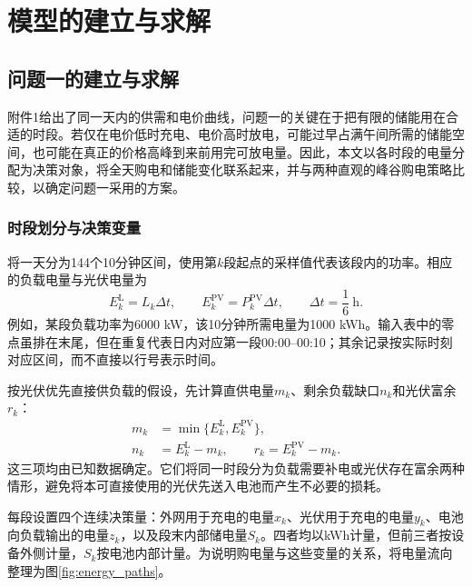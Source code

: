 \section{模型的建立与求解}
\subsection{问题一的建立与求解}

附件1给出了同一天内的供需和电价曲线，问题一的关键在于把有限的储能用在合适的时段。若仅在电价低时充电、电价高时放电，可能过早占满午间所需的储能空间，也可能在真正的价格高峰到来前用完可放电量。因此，本文以各时段的电量分配为决策对象，将全天购电和储能变化联系起来，并与两种直观的峰谷购电策略比较，以确定问题一采用的方案。

\subsubsection{时段划分与决策变量}
将一天分为144个10分钟区间，使用第$k$段起点的采样值代表该段内的功率。相应的负载电量与光伏电量为
\begin{equation}
 E^{\mathrm L}_k=L_k\Delta t,\qquad E^{\mathrm{PV}}_k=P^{\mathrm{PV}}_k\Delta t,
 \qquad \Delta t=\frac{1}{6}\ \mathrm h.
 \label{eq:energy_conversion}
\end{equation}
例如，某段负载功率为6000 kW，该10分钟所需电量为1000 kWh。输入表中的零点虽排在末尾，但在重复代表日内对应第一段00:00--00:10；其余记录按实际时刻对应区间，而不直接以行号表示时间。

按光伏优先直接供负载的假设，先计算直供电量$m_k$、剩余负载缺口$n_k$和光伏富余$r_k$：
\begin{equation}
 \begin{aligned}
 m_k&=\min\{E^{\mathrm L}_k,E^{\mathrm{PV}}_k\},\\
 n_k&=E^{\mathrm L}_k-m_k,\qquad r_k=E^{\mathrm{PV}}_k-m_k.
 \end{aligned}
 \label{eq:pv_first}
\end{equation}
这三项均由已知数据确定。它们将同一时段分为负载需要补电或光伏存在富余两种情形，避免将本可直接使用的光伏先送入电池而产生不必要的损耗。

每段设置四个连续决策量：外网用于充电的电量$x_k$、光伏用于充电的电量$y_k$、电池向负载输出的电量$z_k$，以及段末内部储电量$S_k$。四者均以kWh计量，但前三者按设备外侧计量，$S_k$按电池内部计量。为说明购电量与这些变量的关系，将电量流向整理为图\ref{fig:energy_paths}。

\begin{inlinefigure}
 
 \caption{问题一的电量分配关系（各箭头表示该时段的电量）}
 \label{fig:energy_paths}
\end{inlinefigure}

